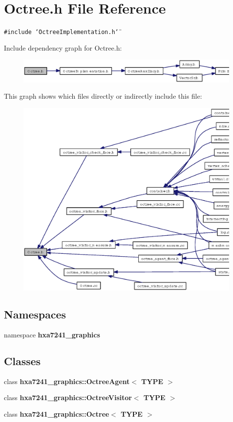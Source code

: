 \section{Octree.h File Reference}
\label{Octree_8h}
{\tt \#include \char`\"{}Octree\-Implementation.h\char`\"{}}\par


Include dependency graph for Octree.h:\begin{figure}[H]
\begin{center}
\leavevmode
\includegraphics[width=364pt]{Octree_8h__incl}
\end{center}
\end{figure}


This graph shows which files directly or indirectly include this file:\begin{figure}[H]
\begin{center}
\leavevmode
\includegraphics[width=326pt]{Octree_8h__dep__incl}
\end{center}
\end{figure}
\subsection*{Namespaces}
\begin{CompactItemize}
\item 
namespace {\bf hxa7241\_\-graphics}
\end{CompactItemize}
\subsection*{Classes}
\begin{CompactItemize}
\item 
class {\bf hxa7241\_\-graphics::Octree\-Agent$<$ TYPE $>$}
\item 
class {\bf hxa7241\_\-graphics::Octree\-Visitor$<$ TYPE $>$}
\item 
class {\bf hxa7241\_\-graphics::Octree$<$ TYPE $>$}
\end{CompactItemize}
